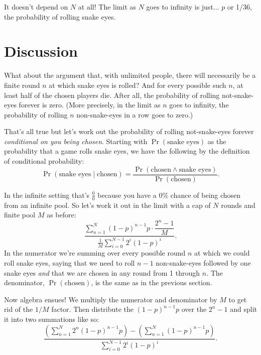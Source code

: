 \documentclass[article,twocolumn]{memoir}
\begin{document}
It doesn't depend on $N$ at all!
The limit as $N$ goes to infinity is just... 
$p$ or 1/36, the probability of rolling snake eyes.
\qedsymbol{}

\chapter*{Discussion}

What about the argument that, with unlimited people, there will necessarily be a finite round $n$ at which snake eyes is rolled?
And for every possible such $n$, at least half of the chosen players die.
After all, the probability of rolling not-snake-eyes forever is zero. 
(More precisely, in the limit as $n$ goes to infinity, the probability of rolling $n$ non-snake-eyes in a row goes to zero.)

That's all true but let's work out the probability of rolling not-snake-eyes forever \emph{conditional on you being chosen}.
Starting with $\Pr(\text{snake eyes})$ as the probability that a game rolls snake eyes, we have the following by the definition of conditional probability:
\begin{equation*}
\Pr(\text{snake eyes} \mid \text{chosen} )
= \frac{\Pr(\text{chosen} \land \text{snake eyes})}{\Pr(\text{chosen})}.
\end{equation*}

In the infinite setting that's
$\tfrac{0}{0}$
because you have a 0\% chance of being chosen from an infinite pool.
So let's work it out in the limit with a cap of $N$ rounds and finite pool $M$ as before:
$$
\dfrac{\sum\limits_{n=1}^{N}(1-p)^{n-1}p \cdot\dfrac{2^n-1}{M}}
{\tfrac{1}{M}\sum\limits_{i=0}^{N-1}2^{i}(1-p)^{i}}.
$$
In the numerator we're summing over every possible round $n$ at which we could roll snake eyes, saying that we need to roll $n-1$ non-snake-eyes followed by one snake eyes \emph{and} that we are chosen in any round from 1 through $n$.
The denominator, $\Pr(\text{chosen})$, is the same as in the previous section.

Now algebra ensues!
We multiply the numerator and denominator by $M$ to get rid of the $1/M$ factor.
Then distribute the $(1-p)^{n-1}p$ over the $2^n-1$ and split it into two summations like so:
$$
\dfrac{
\left(\sum\limits_{n=1}^{N}2^n(1-p)^{n-1}p\right) -
\left(\sum\limits_{n=1}^{N}(1-p)^{n-1}p \right)
}
{\sum\limits_{i=0}^{N-1}2^{i}(1-p)^{i}}.
$$
\end{document}
